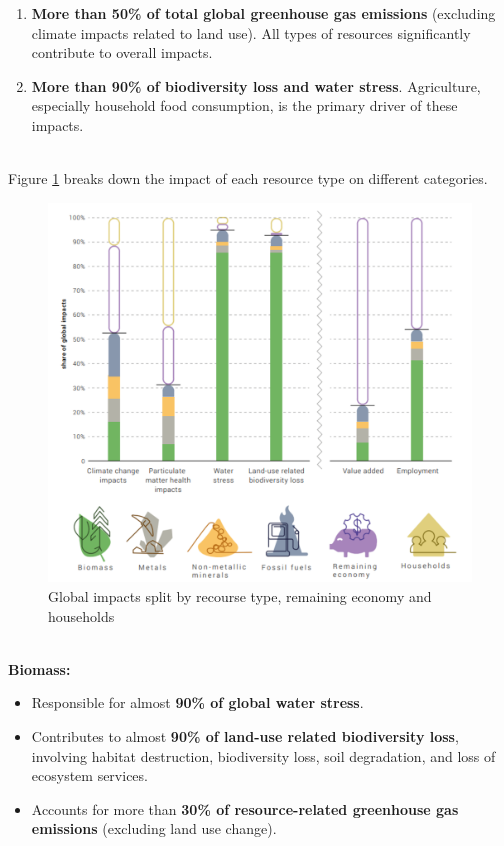 \documentclass[../summary.tex]{subfiles}
\begin{document}
\begin{enumerate}
	\item \textbf{More than 50\% of total global greenhouse gas emissions} (excluding climate impacts related to land use). All types of resources significantly contribute to overall impacts.
	\item \textbf{More than 90\% of biodiversity loss and water stress}. Agriculture, especially household food consumption, is the primary driver of these impacts.
\end{enumerate}
\ \\
Figure \ref{fig:materialimpact} breaks down the impact of each resource type on different categories.
\begin{figure}[H]
	\centering
	\includegraphics[width=0.9\linewidth]{../images/Material_impact}
	\caption{Global impacts split by recourse type, remaining economy and households}
	\label{fig:materialimpact}
\end{figure}
\newpage
\ \\
\textbf{Biomass:}
\begin{itemize}
	\item Responsible for almost \textbf{90\% of global water stress}.
	\item Contributes to almost \textbf{90\% of land-use related biodiversity loss}, involving habitat destruction, biodiversity loss, soil degradation, and loss of ecosystem services.
	\item Accounts for more than \textbf{30\% of resource-related greenhouse gas emissions} (excluding land use change).
\end{itemize}
\end{document}
